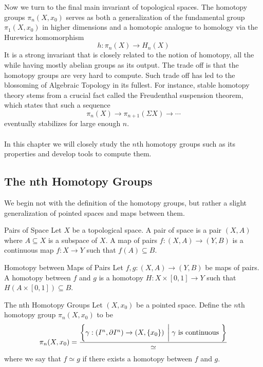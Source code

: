 \documentclass[a4paper]{article}
\begin{document}
Now we turn to the final main invariant of topological spaces. The homotopy groups $\pi_n(X,x_0)$ serves as both a generalization of the fundamental group $\pi_1(X,x_0)$ in higher dimensions and a homotopic analogue to homology via the Hurewicz homomorphism $$h:\pi_n(X)\to H_n(X)$$ It is a strong invariant that is closely related to the notion of homotopy, all the while having mostly abelian groups as its output. The trade off is that the homotopy groups are very hard to compute. Such trade off has led to the blossoming of Algebraic Topology in its fullest. For instance, stable homotopy theory stems from a crucial fact called the Freudenthal suspension theorem, which states that such a sequence $$\pi_n(X)\to\pi_{n+1}(\Sigma X)\to\cdots$$ eventually stabilizes for large enough $n$. \\~\\

In this chapter we will closely study the $n$th homotopy groups such as its properties and develop tools to compute them. 

\subsection{The nth Homotopy Groups}
We begin not with the definition of the homotopy groups, but rather a slight generalization of pointed spaces and maps between them. 

\begin{defn}{Pairs of Space}{} Let $X$ be a topological space. A pair of space is a pair $(X,A)$ where $A\subseteq X$ is a subspace of $X$. A map of pairs $f:(X,A)\to(Y,B)$ is a continuous map $f:X\to Y$ such that $f(A)\subseteq B$. 
\end{defn}

\begin{defn}{Homotopy between Maps of Pairs}{} Let $f,g:(X,A)\to (Y,B)$ be maps of pairs. A homotopy between $f$ and $g$ is a homotopy $H:X\times[0,1]\to Y$ such that $H(A\times[0,1])\subseteq B$. 
\end{defn}

\begin{defn}{The nth Homotopy Groups}{} Let $(X,x_0)$ be a pointed space. Define the $n$th homotopy group $\pi_n(X,x_0)$ to be $$\pi_n(X,x_0)=\frac{\left\{\gamma:\left(I^n,\partial I^n\right)\to\left(X,\{x_0\}\right)\;\bigg{|}\;\gamma\text{ is continuous }\right\}}{\simeq}$$ where we say that $f\simeq g$ if there exists a homotopy between $f$ and $g$. 
\end{defn}
\end{document}
